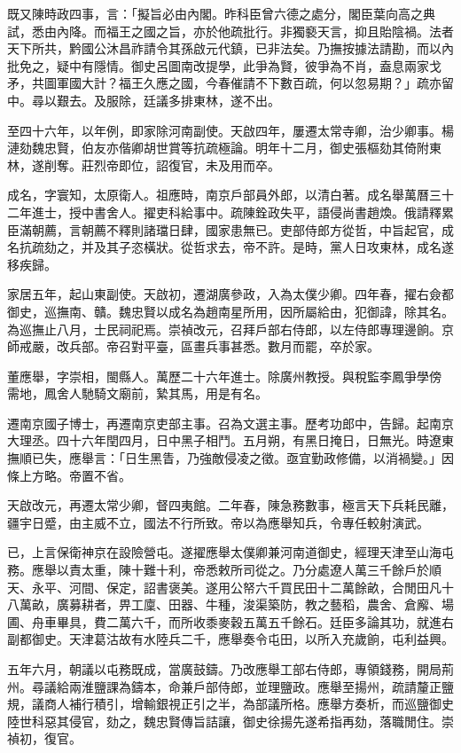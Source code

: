 \begin{pinyinscope}
既又陳時政四事，言：「擬旨必由內閣。昨科臣曾六德之處分，閣臣葉向高之典試，悉由內降。而福王之國之旨，亦於他疏批行。非獨褻天言，抑且貽陰禍。法者天下所共，黔國公沐昌祚請令其孫啟元代鎮，已非法矣。乃撫按據法請勘，而以內批免之，疑中有隱情。御史呂圖南改提學，此爭為賢，彼爭為不肖，盍息兩家戈矛，共圖軍國大計？福王久應之國，今春催請不下數百疏，何以忽易期？」疏亦留中。尋以艱去。及服除，廷議多排東林，遂不出。

至四十六年，以年例，即家除河南副使。天啟四年，屢遷太常寺卿，治少卿事。楊漣劾魏忠賢，伯友亦偕卿胡世賞等抗疏極論。明年十二月，御史張樞劾其倚附東林，遂削奪。莊烈帝即位，詔復官，未及用而卒。

成名，字寰知，太原衛人。祖應時，南京戶部員外郎，以清白著。成名舉萬曆三十二年進士，授中書舍人。擢吏科給事中。疏陳銓政失平，語侵尚書趙煥。俄請釋累臣滿朝薦，言朝薦不釋則諸璫日肆，國家患無已。吏部侍郎方從哲，中旨起官，成名抗疏劾之，并及其子恣橫狀。從哲求去，帝不許。是時，黨人日攻東林，成名遂移疾歸。

家居五年，起山東副使。天啟初，遷湖廣參政，入為太僕少卿。四年春，擢右僉都御史，巡撫南、贛。魏忠賢以成名為趙南星所用，因所屬給由，犯御諱，除其名。為巡撫止八月，士民祠祀焉。崇禎改元，召拜戶部右侍郎，以左侍郎專理邊餉。京師戒嚴，改兵部。帝召對平臺，區畫兵事甚悉。數月而罷，卒於家。

董應舉，字崇相，閩縣人。萬歷二十六年進士。除廣州教授。與稅監李鳳爭學傍需地，鳳舍人馳騎文廟前，縶其馬，用是有名。

遷南京國子博士，再遷南京吏部主事。召為文選主事。歷考功郎中，告歸。起南京大理丞。四十六年閏四月，日中黑子相鬥。五月朔，有黑日掩日，日無光。時遼東撫順已失，應舉言：「日生黑眚，乃強敵侵凌之徵。亟宜勤政修備，以消禍變。」因條上方略。帝置不省。

天啟改元，再遷太常少卿，督四夷館。二年春，陳急務數事，極言天下兵耗民離，疆宇日蹙，由主威不立，國法不行所致。帝以為應舉知兵，令專任較射演武。

已，上言保衛神京在設險營屯。遂擢應舉太僕卿兼河南道御史，經理天津至山海屯務。應舉以責太重，陳十難十利，帝悉敕所司從之。乃分處遼人萬三千餘戶於順天、永平、河間、保定，詔書褒美。遂用公帑六千買民田十二萬餘畝，合閒田凡十八萬畝，廣募耕者，畀工廩、田器、牛種，浚渠築防，教之藝稻，農舍、倉廨、場圃、舟車畢具，費二萬六千，而所收黍麥穀五萬五千餘石。廷臣多論其功，就進右副都御史。天津葛沽故有水陸兵二千，應舉奏令屯田，以所入充歲餉，屯利益興。

五年六月，朝議以屯務既成，當廣鼓鑄。乃改應舉工部右侍郎，專領錢務，開局荊州。尋議給兩淮鹽課為鑄本，命兼戶部侍郎，並理鹽政。應舉至揚州，疏請釐正鹽規，議商人補行積引，增輸銀視正引之半，為部議所格。應舉方奏析，而巡鹽御史陸世科惡其侵官，劾之，魏忠賢傳旨詰讓，御史徐揚先遂希指再劾，落職閒住。崇禎初，復官。


\end{pinyinscope}
